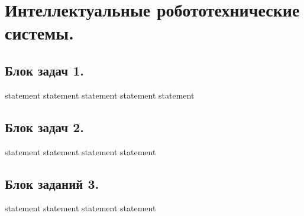 \chapter{Интеллектуальные робототехнические системы.}

\section{Блок задач 1.}

{statement}
{statement}
{statement}
{statement}
{statement}

\section{Блок задач 2.}

{statement}
{statement}
{statement}
{statement}

\section{Блок заданий 3.}

{statement}
{statement}
{statement}
{statement}